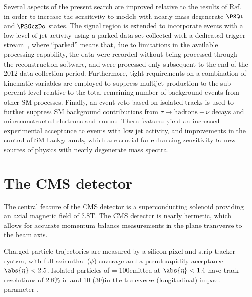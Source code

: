 Several aspects of the present search are improved relative to the
results of Ref.~\cite{RA1Paper2012} in order to increase the
sensitivity to models with nearly mass-degenerate $\PSQt$ and
$\PSGczDo$ states. The signal region is extended to incorporate events
with a low level of jet activity using a parked data set collected
with a dedicated trigger stream~\cite{CMS:2012ooa}, where ``parked''
means that, due to limitations in the available processing capability,
the data were recorded without being processed through the
reconstruction software, and were processed only subsequent to the end
of the 2012 data collection period. Furthermore, tight requirements on
a combination of kinematic variables are employed to suppress multijet
production to the sub-percent level relative to the total remaining
number of background events from other SM processes. Finally, an event
veto based on isolated tracks is used to further suppress SM
background contributions from $\tau \to \text{hadrons} + \nu$ decays
and misreconstructed electrons and muons. These features yield an
increased experimental acceptance to events with low jet activity, and
improvements in the control of SM backgrounds, which are crucial for
enhancing sensitivity to new sources of physics with nearly degenerate
mass spectra.

\section{The CMS detector}

The central feature of the CMS detector is a superconducting solenoid
providing an axial magnetic field of 3.8\unit{T}. The CMS detector is
nearly hermetic, which allows for accurate momentum balance
measurements in the plane transverse to the beam axis.

Charged particle trajectories are measured by a silicon pixel and
strip tracker system, with full azimuthal ($\phi$) coverage and a
pseudorapidity acceptance $\abs{\eta} < 2.5$.  Isolated particles of
\pt = 100\GeV emitted at $\abs{\eta} < 1.4$ have track resolutions of
2.8\% in \pt and 10 (30)\mum in the transverse (longitudinal) impact
parameter \cite{TRK-11-001}.

